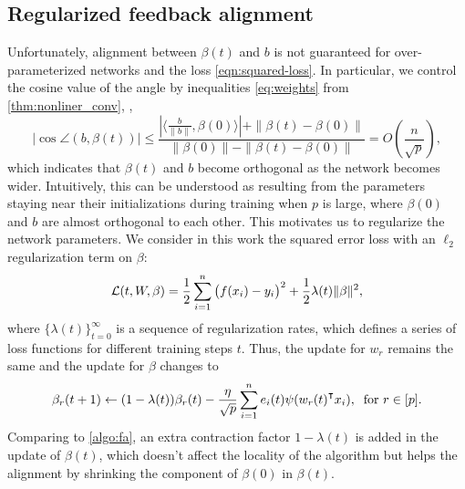 \subsection{Regularized feedback alignment}
Unfortunately, alignment between $\beta(t)$ and $b$ is not guaranteed for over-parameterized networks and the loss \eqref{eqn:squared-loss}. In particular,  we control the cosine value of the angle by inequalities \eqref{eq:weights} from \cref{thm:nonliner_conv}, \ie,
\begin{equation}
    \Big|\cos\angle(b, \beta(t))\Big| \leq \frac{|\langle \frac{b}{\|b\|}, \beta(0)\rangle|+ \|\beta(t)- \beta(0)\|}{\|\beta(0)\|-\|\beta(t)-\beta(0)\|} = O\left(\frac{n}{\sqrt p}\right),
\end{equation}
which indicates that $\beta(t)$ and $b$ become orthogonal as the network becomes wider. Intuitively, this can be understood as resulting from the parameters staying near their initializations during training when $p$ is large, where $\beta(0)$ and $b$ are almost orthogonal to each other. This motivates us to regularize the network parameters. We consider in this work the squared error loss with an $\ell_2$ regularization term on $\beta$:
\begin{equation}
\label{eqn:loss-with-reg}
\mathcal{L}(t, W, \beta) = \frac{1}{2}\sum_{i=1}^n\big(f(x_i)-y_i\big)^2 + \frac{1}{2}\lambda(t)\|\beta\|^2,
\end{equation}
where $\{\lambda(t)\}_{t=0}^\infty$ is a sequence of regularization rates, which defines a series of loss functions for different training steps $t$.
Thus, the update for $w_r$ remains the same and the
update for $\beta$ changes to
$$\beta_r(t+1) \gets (1-\lambda(t))\beta_r(t) - \frac{\eta}{\sqrt p} \sum_{i=1}^n e_i(t)\psi(w_r(t)\transpose x_i), \;\;\mbox{for $r\in[p]$.}$$
Comparing to \cref{algo:fa}, an extra contraction factor $1-\lambda(t)$ is added in the update of $\beta(t)$, which doesn't affect the locality of the algorithm but helps the alignment by shrinking the component of $\beta(0)$ in $\beta(t)$.



